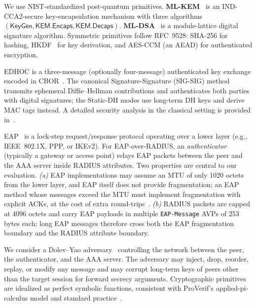 \documentclass{easychair}
\newcommand{\KemKeyGen}{\mathsf{KeyGen}}
\newcommand{\Encaps}{\mathsf{KEM.Encaps}}
\newcommand{\Decaps}{\mathsf{KEM.Decaps}}
\begin{document}
We use NIST-standardized post-quantum primitives.
\textbf{ML-KEM}~\cite{FIPS203} is an IND-CCA2-secure key-encapsulation
mechanism with three algorithms $(\KemKeyGen,\Encaps,\Decaps)$.
\textbf{ML-DSA}~\cite{FIPS204} is a module-lattice digital signature
algorithm. Symmetric primitives follow RFC~9528: SHA-256 for hashing,
HKDF~\cite{RFC5869} for key derivation, and AES-CCM (an AEAD) for
authenticated encryption.

EDHOC is a three-message (optionally four-message) authenticated key
exchange encoded in CBOR~\cite{RFC8949,RFC9052}. The canonical
Signature-Signature (SIG-SIG) method transmits ephemeral Diffie--Hellman
contributions and authenticates both parties with digital signatures; the
Static-DH modes use long-term DH keys and derive MAC tags instead.
A detailed security analysis in the classical setting is provided
in~\cite{NSB21,CP22,GM23,JKK+23,Fer24,PSM+24}.

EAP~\cite{RFC3748} is a lock-step request/response protocol operating over
a lower layer (e.g., IEEE~802.1X, PPP, or IKEv2). For EAP-over-RADIUS, an
\emph{authenticator} (typically a gateway or access point) relays EAP
packets between the peer and the AAA server inside RADIUS attributes. Two
properties are central to our evaluation. \emph{(a)} EAP implementations
may assume an MTU of only 1020 octets from the lower layer, and EAP itself
does not provide fragmentation; an EAP method whose messages exceed the
MTU must implement fragmentation with explicit ACKs, at the cost of extra
round-trips~\cite{RFC3748,RFC9191}. \emph{(b)} RADIUS packets are capped
at 4096 octets and carry EAP payloads in multiple \texttt{EAP-Message}
AVPs of 253 bytes each; long EAP messages therefore cross both the EAP
fragmentation boundary and the RADIUS attribute boundary.

We consider a Dolev--Yao adversary~\cite{dolev1983security} controlling the
network between the peer, the authenticator, and the AAA server. The
adversary may inject, drop, reorder, replay, or modify any message and may
corrupt long-term keys of peers other than the target session for forward
secrecy arguments. Cryptographic primitives are idealized as perfect
symbolic functions, consistent with ProVerif's applied-pi-calculus model
and standard practice~\cite{blanchet2001proverif,blanchet2016automated,cremers2017symbolic}.
\end{document}
